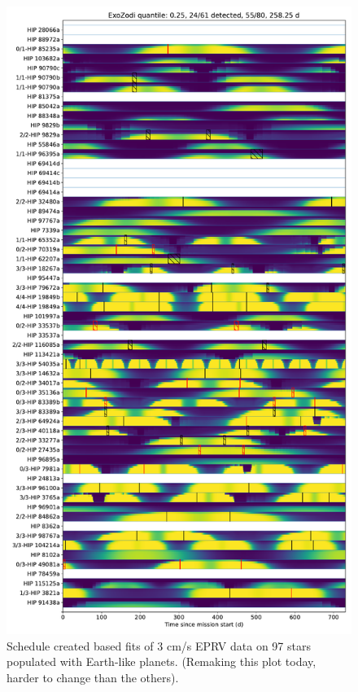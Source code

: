 \begin{figure}
  \begin{center}
    \includegraphics[height=0.9\textheight]{ch4/figures/full_schedule_2.pdf}
  \end{center}
  \caption{
    Schedule created based fits of 3 cm/s EPRV data on 97 stars populated with
    Earth-like planets. (Remaking this plot today, harder to change than the others).
  }
  \label{fig:schedule}
\end{figure}

